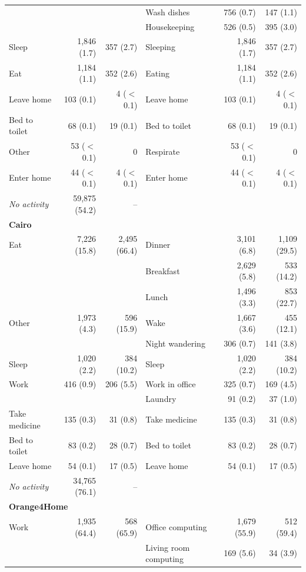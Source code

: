 \begin{tabular}{l rr l rr}
 &  &  & Wash dishes & 756 (0.7) & 147 (1.1) \\
 &  &  & Housekeeping & 526 (0.5) & 395 (3.0) \\
Sleep & 1{,}846 (1.7) & 357 (2.7) & Sleeping & 1{,}846 (1.7) & 357 (2.7) \\
Eat & 1{,}184 (1.1) & 352 (2.6) & Eating & 1{,}184 (1.1) & 352 (2.6) \\
Leave home & 103 (0.1) & 4 ($<$0.1) & Leave home & 103 (0.1) & 4 ($<$0.1) \\
Bed to toilet & 68 (0.1) & 19 (0.1) & Bed to toilet & 68 (0.1) & 19 (0.1) \\
Other & 53 ($<$0.1) & 0 & Respirate & 53 ($<$0.1) & 0 \\
Enter home & 44 ($<$0.1) & 4 ($<$0.1) & Enter home & 44 ($<$0.1) & 4 ($<$0.1) \\
\textit{No activity} & 59{,}875 (54.2) & -- &  &  &  \\
\midrule
\multicolumn{6}{l}{\textbf{Cairo}} \\
Eat & 7{,}226 (15.8) & 2{,}495 (66.4) & Dinner & 3{,}101 (6.8) & 1{,}109 (29.5) \\
 &  &  & Breakfast & 2{,}629 (5.8) & 533 (14.2) \\
 &  &  & Lunch & 1{,}496 (3.3) & 853 (22.7) \\
Other & 1{,}973 (4.3) & 596 (15.9) & Wake & 1{,}667 (3.6) & 455 (12.1) \\
 &  &  & Night wandering & 306 (0.7) & 141 (3.8) \\
Sleep & 1{,}020 (2.2) & 384 (10.2) & Sleep & 1{,}020 (2.2) & 384 (10.2) \\
Work & 416 (0.9) & 206 (5.5) & Work in office & 325 (0.7) & 169 (4.5) \\
 &  &  & Laundry & 91 (0.2) & 37 (1.0) \\
Take medicine & 135 (0.3) & 31 (0.8) & Take medicine & 135 (0.3) & 31 (0.8) \\
Bed to toilet & 83 (0.2) & 28 (0.7) & Bed to toilet & 83 (0.2) & 28 (0.7) \\
Leave home & 54 (0.1) & 17 (0.5) & Leave home & 54 (0.1) & 17 (0.5) \\
\textit{No activity} & 34{,}765 (76.1) & -- &  &  &  \\
\midrule
\multicolumn{6}{l}{\textbf{Orange4Home}} \\
Work & 1{,}935 (64.4) & 568 (65.9) & Office computing & 1{,}679 (55.9) & 512 (59.4) \\
 &  &  & Living room computing & 169 (5.6) & 34 (3.9) \\

\end{tabular}

